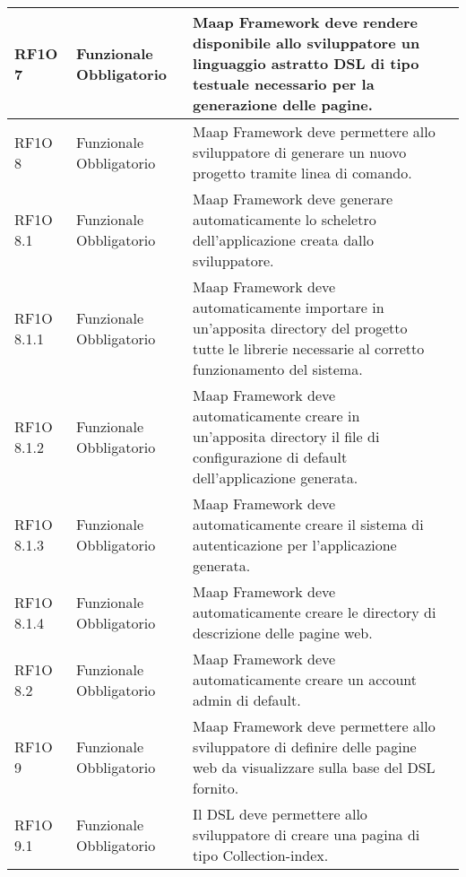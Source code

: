 \begin{center}
\begin{longtable}{ | p{2cm} | p{2cm} | p{5cm} | p{2cm} |}
        RF1O 7 & Funzionale \newline  Obbligatorio  & Maap Framework deve rendere disponibile allo sviluppatore un linguaggio astratto DSL di tipo testuale necessario per la generazione delle pagine. &  \\ \hline      
        RF1O 8  & Funzionale \newline  Obbligatorio  & Maap Framework deve permettere allo sviluppatore di generare un nuovo progetto tramite linea di comando.
 &  \\ \hline      
        RF1O 8.1  & Funzionale \newline  Obbligatorio  & Maap Framework deve generare automaticamente lo scheletro dell'applicazione creata dallo sviluppatore.
 &  \\ \hline      
        RF1O 8.1.1  & Funzionale \newline  Obbligatorio  & Maap Framework deve automaticamente importare in un'apposita directory del progetto tutte le librerie necessarie al corretto funzionamento del sistema.
 &  \\ \hline      
        RF1O 8.1.2 & Funzionale \newline  Obbligatorio  & Maap Framework deve automaticamente creare in un'apposita directory il file di configurazione di default dell'applicazione generata.
 &  \\ \hline      
        RF1O 8.1.3  & Funzionale \newline  Obbligatorio  & Maap Framework deve automaticamente creare il sistema di autenticazione per l'applicazione generata. &  \\ \hline      
        RF1O 8.1.4  & Funzionale \newline  Obbligatorio  & Maap Framework deve automaticamente creare le directory di descrizione delle pagine web.
 &  \\ \hline      
        RF1O 8.2  & Funzionale \newline  Obbligatorio  & Maap Framework deve automaticamente creare un account admin di default. &  \\ \hline      
        RF1O 9  & Funzionale \newline  Obbligatorio  & Maap Framework deve permettere allo sviluppatore di definire delle pagine web da visualizzare sulla base del DSL fornito.
 &  \\ \hline      
        RF1O 9.1  & Funzionale \newline  Obbligatorio  & Il DSL deve permettere allo sviluppatore di creare una pagina di tipo Collection-index.

\end{longtable}
\end{center}

